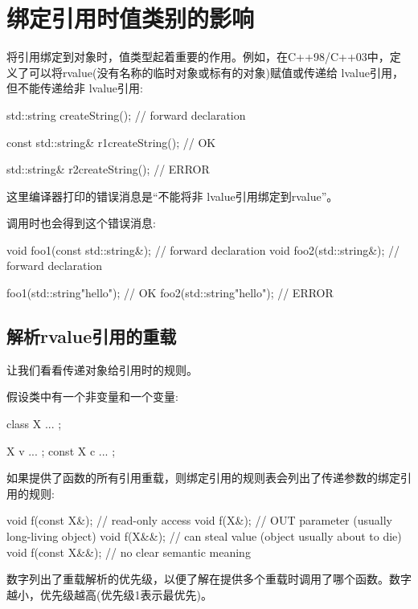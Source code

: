 \section{绑定引用时值类别的影响}
将引用绑定到对象时，值类型起着重要的作用。例如，在C++98/C++03中，定义了可以将rvalue(没有名称的临时对象或标有的对象)赋值或传递给 lvalue引用，但不能传递给非 lvalue引用:

\begin{cppcode}
std::string createString(); // forward declaration

const std::string& r1{createString()}; // OK

std::string& r2{createString()}; // ERROR
\end{cppcode}

这里编译器打印的错误消息是“不能将非 lvalue引用绑定到rvalue”。

调用时也会得到这个错误消息:

\begin{cppcode}
void foo1(const std::string&); // forward declaration
void foo2(std::string&); // forward declaration

foo1(std::string{"hello"}); // OK
foo2(std::string{"hello"}); // ERROR
\end{cppcode}

\subsection{解析rvalue引用的重载}

让我们看看传递对象给引用时的规则。

假设类中有一个非变量和一个变量:

\begin{cppcode}
class X {
	...
};

X v{ ... };
const X c{ ... };
\end{cppcode}

如果提供了函数的所有引用重载，则绑定引用的规则表会列出了传递参数的绑定引用的规则:

\begin{cppcode}
void f(const X&); // read-only access
void f(X&); // OUT parameter (usually long-living object)
void f(X&&); // can steal value (object usually about to die)
void f(const X&&); // no clear semantic meaning
\end{cppcode}

数字列出了重载解析的优先级，以便了解在提供多个重载时调用了哪个函数。数字越小，优先级越高(优先级1表示最优先)。


